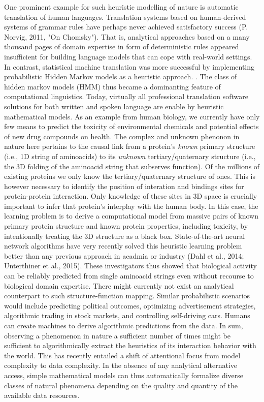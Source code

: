 \documentclass[authoryear,review,3p]{elsarticle}
\begin{document}
One prominent example for such heuristic modelling of nature is
automatic translation of human languages.
Translation systems based on 
human-derived systems of grammar rules have perhaps never achieved
satisfactory success (P. Norvig, 2011, "On Chomsky").
That is, analytical approaches based on
a many thousand pages of domain expertise in form of
deterministic rules appeared insufficient for building
language models that can cope with real-world settings.
%
In contrast, statistical machine translation was more successful
by implementing probabilistic Hidden Markov models
as a heuristic approach.
.
The class of hidden markov models (HMM)
thus became a dominanting feature
of computational linguistics.
%
Today, virtually all professional translation software solutions
for both written and spoken language
are enable by heuristic mathematical models.
%
%
%
As an example from human biology,
we currently have only few means to predict the
toxicity of environmental chemicals and
potential effects of new drug compounds on health.
%
The complex and unknown phenonon in nature here pertains
to the causal link from
a protein's \textit{known} primary structure
(i.e., 1D string of aminoacids)
to
its \textit{unknown} tertiary/quaternary structure
(i.e., the 3D folding of the aminoacid string that subserves function).
%
Of the millions of existing proteins
we only know the tertiary/quaternary structure of
 ones.
This is however necessary to identify the position of
interation and bindings sites
for protein-protein interaction.
Only knowledge of these sites in 3D space is crucially important
to infer that protein's interplay with the human body.
%
In this case,
the learning problem is to
derive a computational model from
massive pairs of known primary protein structure and
known protein properties, including toxicity,
by intentionally treating the 3D structure
as a black box.
%
State-of-the-art neural network algorithms
have very recently solved this heuristic learning problem
better than any previous approach in acadmia or industry
(Dahl et al., 2014; Unterthiner et al., 2015).
These investigators thus showed that biological activity
can be reliably predicted from single aminoacid strings
even without recourse to biological domain expertise.
%
There might currently not exist
an analytical counterpart to such
structure-function mapping.
%
%
Similar probabilistic scenarios would include predicting
political outcomes,
optimizing advertisement strategies,
algorithmic trading in stock markets, and
controlling self-driving cars.
Humans can create machines to derive
algorithmic predictions from the data.
%
%
In sum,
observing a phenomenon in nature a sufficient number of times
might be sufficient to
algorithmically extract
the heuristics of its interaction behavior with the world.
This has recently entailed a shift
of attentional focus from model complexity to data complexity.
In the absence of any analytical alternative access,
simple mathematical models can thus automatically
formalize diverse classes of natural phenomena
depending on the quality and quantity of
the available data resources.
\end{document}
